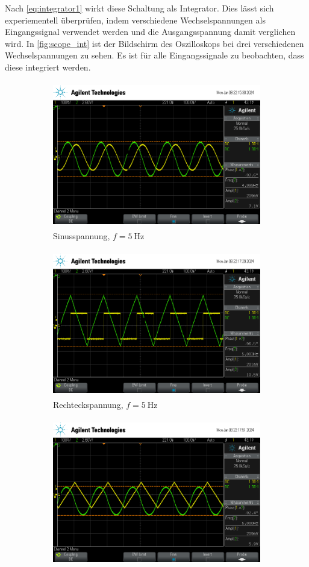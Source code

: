 Nach \autoref{eq:integrator1} wirkt diese Schaltung als Integrator. Dies lässt sich experiementell überprüfen, indem verschiedene Wechselspannungen als Eingangssignal verwendet werden
und die Ausgangsspannung damit verglichen wird. In \autoref{fig:scope_int} ist der Bildschirm des Oszilloskops bei drei verschiedenen Wechselspannungen zu sehen. Es ist für alle Eingangssignale
zu beobachten, dass diese integriert werden.

\begin{figure}
  \begin{subfigure}[c]{0.9\textwidth}
    \centering
    \includegraphics[height=6.4cm]{content/scope/scope_1.png}
    \caption{Sinusspannung, $f=\qty{5}{\hertz}$}
  \end{subfigure}
  \begin{subfigure}[c]{0.9\textwidth}
    \centering
    \includegraphics[height=6.4cm]{content/scope/scope_4.png}
    \caption{Rechteckspannung, $f=\qty{5}{\hertz}$}
  \end{subfigure}
  \begin{subfigure}[c]{0.9\textwidth}
    \centering
    \includegraphics[height=6.4cm]{content/scope/scope_5.png}

\end{subfigure}
\end{figure}
